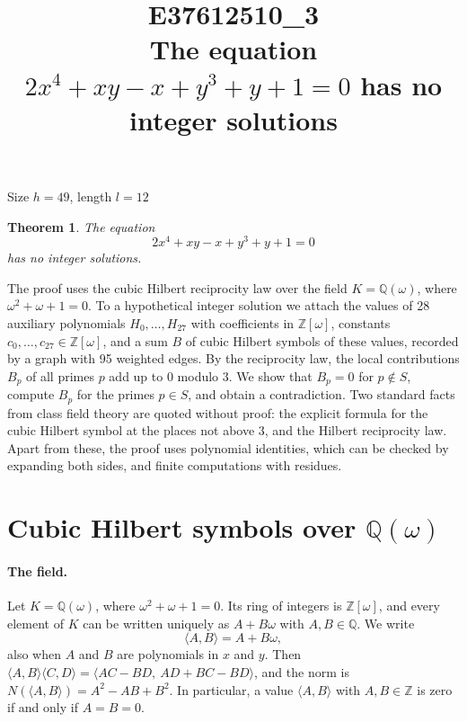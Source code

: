 \documentclass[11pt]{article}
\title{\textbf{E37612510\_3}\\[4pt] {\Large The equation $2x^{4}+xy-x+y^{3}+y+1=0$ has no integer solutions}}
\author{}
\date{}
\newtheorem{theorem}{Theorem}
\newcommand{\Z}{\mathbb{Z}}
\newcommand{\Q}{\mathbb{Q}}
\begin{document}
\maketitle
\vspace{-8ex}
\begin{center}
Size $h=49$, length $l=12$
\end{center}

\begin{theorem}\label{thm:main}
The equation
\begin{equation}\label{eq:main}
2x^{4}+xy-x+y^{3}+y+1=0
\end{equation}
has no integer solutions.
\end{theorem}

The proof uses the cubic Hilbert reciprocity law over the field $K=\Q(\omega)$, where $\omega^2+\omega+1=0$. To a hypothetical integer solution we attach the values of 28 auxiliary polynomials $H_0,\dots,H_{27}$ with coefficients in $\Z[\omega]$, constants $c_0,\dots,c_{27}\in\Z[\omega]$, and a sum $B$ of cubic Hilbert symbols of these values, recorded by a graph with 95 weighted edges. By the reciprocity law, the local contributions $B_p$ of all primes $p$ add up to $0$ modulo $3$. We show that $B_p=0$ for $p\notin S$, compute $B_p$ for the primes $p\in S$, and obtain a contradiction. Two standard facts from class field theory are quoted without proof: the explicit formula for the cubic Hilbert symbol at the places not above $3$, and the Hilbert reciprocity law. Apart from these, the proof uses polynomial identities, which can be checked by expanding both sides, and finite computations with residues.


\section{\texorpdfstring{Cubic Hilbert symbols over $\Q(\omega)$}{Cubic Hilbert symbols over Q(w)}}\label{sec:symbols}

\paragraph{The field.} Let $K=\Q(\omega)$, where $\omega^2+\omega+1=0$. Its ring of integers is $\Z[\omega]$, and every element of $K$ can be written uniquely as $A+B\omega$ with $A,B\in\Q$. We write
\[
\langle A,B\rangle=A+B\omega,
\]
also when $A$ and $B$ are polynomials in $x$ and $y$. Then $\langle A,B\rangle\langle C,D\rangle=\langle AC-BD,\ AD+BC-BD\rangle$, and the norm is $N(\langle A,B\rangle)=A^2-AB+B^2$. In particular, a value $\langle A,B\rangle$ with $A,B\in\Z$ is zero if and only if $A=B=0$.
\end{document}
